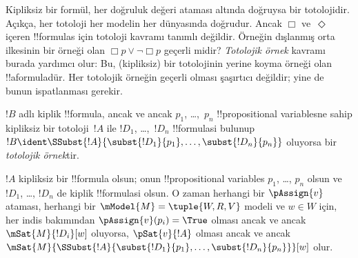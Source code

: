 



\begin{explain}
Kipliksiz bir formül, her doğruluk değeri ataması altında doğruysa bir
totolojidir. Açıkça, her totoloji her modelin her dünyasında doğrudur. Ancak
$\Box$ ve~$\Diamond$ içeren !!{formula}s için totoloji kavramı tanımlı
değildir. Örneğin dışlanmış orta ilkesinin bir örneği olan $\Box p \lor
\lnot \Box p$ geçerli midir? \emph{Totolojik örnek} kavramı burada yardımcı
olur: Bu, (kipliksiz) bir totolojinin yerine koyma örneği olan
!!a{formula}{}dür. Her totolojik örneğin geçerli olması şaşırtıcı değildir;
yine de bunun ispatlanması gerekir.
\end{explain}

\begin{defn}
  $!B$ adlı kiplik !!{formula}, ancak ve ancak $p_1$, \dots,~$p_n$
  !!{propositional variable}s{}ne sahip kipliksiz bir totoloji~$!A$ ile
  $!D_1$, \dots,~$!D_n$ !!{formula}s{}i bulunup
  $!B \ident \SSubst{!A}{\subst{!D_1}{p_1},
    \dots, \subst{!D_n}{p_n}}$ oluyorsa bir \emph{totolojik örnek}tir.
\end{defn}

\begin{lem}
  $!A$ kipliksiz bir !!{formula} olsun; onun !!{propositional variable}s
  $p_1$, \dots, $p_n$ olsun ve $!D_1$, \dots, $!D_n$ de kiplik
  !!{formula}s{}i olsun.
  O zaman herhangi bir $\pAssign{v}$ ataması, herhangi bir
  $\mModel{M} = \tuple{W, R, V}$ modeli ve $w \in W$ için, her indis bakımından
  $\pAssign{v}(p_i) = \True$ olması ancak ve ancak $\mSat{M}{!D_i}[w]$
  oluyorsa, $\pSat{v}{!A}$ olması ancak ve ancak
  $\mSat{M}{\SSubst{!A}{\subst{!D_1}{p_1}, \dots,
      \subst{!D_n}{p_n}}}[w]$ olur.
\end{lem}

